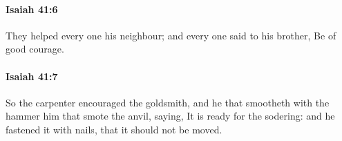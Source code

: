 		\paragraph{Isaiah 41:6} %
			\label{ISAIAH-41-6}

			They helped every one his neighbour; and every one said to his brother, Be of good courage.


		\paragraph{Isaiah 41:7} %
			\label{ISAIAH-41-7}

			So the carpenter encouraged the goldsmith, and he that smootheth with the hammer him that smote the anvil, saying, It is ready for the sodering: and he fastened it with nails, that it should not be moved.


